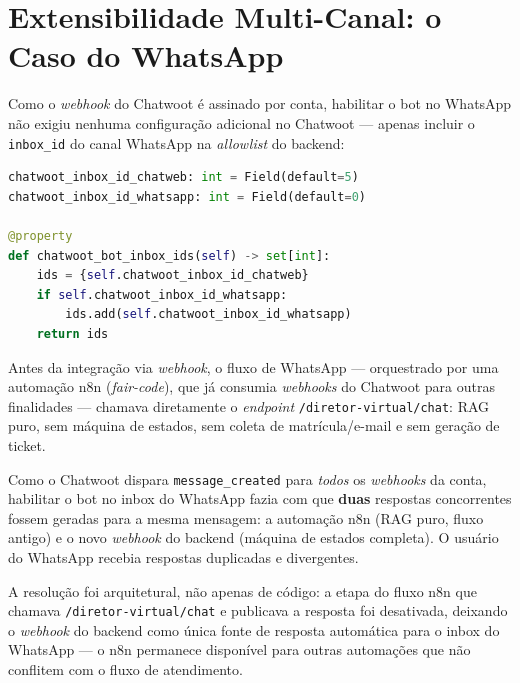\documentclass[12pt,a4paper]{report}
\begin{document}
\section{Extensibilidade Multi-Canal: o Caso do WhatsApp}
\label{sec:multicanal}

Como o \textit{webhook} do Chatwoot é assinado por conta, habilitar o bot no
WhatsApp não exigiu nenhuma configuração adicional no Chatwoot — apenas
incluir o \texttt{inbox\_id} do canal WhatsApp na \textit{allowlist} do
backend:

\begin{lstlisting}[language=Python,caption={\textit{Allowlist} de inboxes (\texttt{settings.py}).}]
chatwoot_inbox_id_chatweb: int = Field(default=5)
chatwoot_inbox_id_whatsapp: int = Field(default=0)

@property
def chatwoot_bot_inbox_ids(self) -> set[int]:
    ids = {self.chatwoot_inbox_id_chatweb}
    if self.chatwoot_inbox_id_whatsapp:
        ids.add(self.chatwoot_inbox_id_whatsapp)
    return ids
\end{lstlisting}

\begin{historico}
Antes da integração via \textit{webhook}, o fluxo de WhatsApp — orquestrado
por uma automação n8n \autocite{n8n2019} (\textit{fair-code}), que já consumia
\textit{webhooks} do Chatwoot para outras finalidades — chamava diretamente
o \textit{endpoint} \texttt{/diretor-virtual/chat}: RAG puro, sem máquina de
estados, sem coleta de matrícula/e-mail e sem geração de ticket.
\end{historico}

\begin{problema}
Como o Chatwoot dispara \texttt{message\_created} para \emph{todos} os
\textit{webhooks} da conta, habilitar o bot no inbox do WhatsApp fazia com
que \textbf{duas} respostas concorrentes fossem geradas para a mesma
mensagem: a automação n8n (RAG puro, fluxo antigo) e o novo \textit{webhook}
do backend (máquina de estados completa). O usuário do WhatsApp recebia
respostas duplicadas e divergentes.
\end{problema}

A resolução foi arquitetural, não apenas de código: a etapa do fluxo n8n que
chamava \texttt{/diretor-virtual/chat} e publicava a resposta foi
desativada, deixando o \textit{webhook} do backend como única fonte de
resposta automática para o inbox do WhatsApp — o n8n permanece disponível
para outras automações que não conflitem com o fluxo de atendimento.
\end{document}

